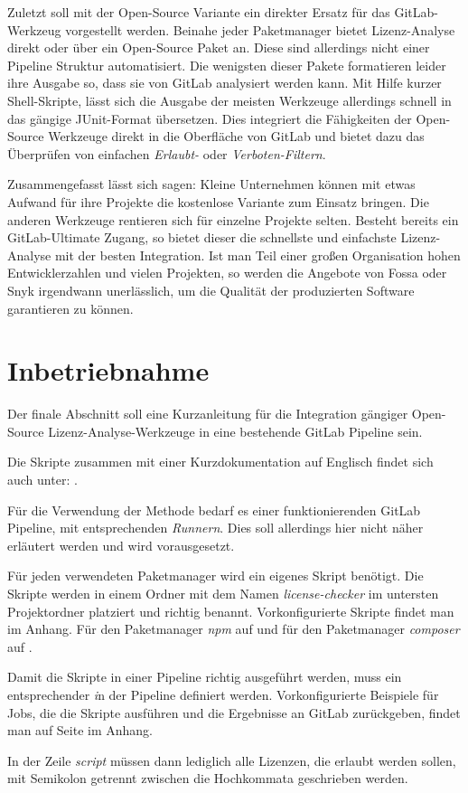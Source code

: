 Zuletzt soll mit der Open-Source Variante ein direkter Ersatz für das GitLab-Werkzeug vorgestellt werden. 
Beinahe jeder Paketmanager bietet Lizenz-Analyse direkt oder über ein Open-Source Paket an. Diese sind allerdings nicht einer Pipeline Struktur automatisiert. 
Die wenigsten dieser Pakete formatieren leider ihre Ausgabe so, dass sie von GitLab analysiert werden kann. Mit Hilfe kurzer Shell-Skripte, lässt sich die Ausgabe der meisten Werkzeuge allerdings schnell in das gängige JUnit-Format \cite{ibmJUnitStandard} übersetzen. Dies integriert die Fähigkeiten der Open-Source Werkzeuge direkt in die Oberfläche von GitLab und bietet dazu das Überprüfen von einfachen \emph{Erlaubt-} oder \emph{Verboten-Filtern}.

Zusammengefasst lässt sich sagen: Kleine Unternehmen können mit etwas Aufwand für ihre Projekte die kostenlose Variante zum Einsatz bringen. Die anderen Werkzeuge rentieren sich für einzelne Projekte selten. Besteht bereits ein GitLab-Ultimate Zugang, so bietet dieser die schnellste und einfachste Lizenz-Analyse mit der besten Integration. Ist man Teil einer großen Organisation hohen Entwicklerzahlen und vielen Projekten, so werden die Angebote von Fossa oder Snyk irgendwann unerlässlich, um die Qualität der produzierten Software garantieren zu können.


\section{Inbetriebnahme}

Der finale Abschnitt soll eine Kurzanleitung für die Integration gängiger Open-Source Lizenz-Analyse-Werkzeuge in eine bestehende GitLab Pipeline sein.

Die Skripte zusammen mit einer Kurzdokumentation auf Englisch findet sich auch unter: \cite{kellOpenSourceLicenseChecker2021}. 

Für die Verwendung der Methode bedarf es einer funktionierenden GitLab Pipeline, mit entsprechenden \emph{Runnern}. Dies soll allerdings hier nicht näher erläutert werden und wird vorausgesetzt. 

Für jeden verwendeten Paketmanager wird ein eigenes Skript benötigt. Die Skripte werden in einem Ordner mit dem Namen \emph{license-checker} im untersten Projektordner platziert und richtig benannt. 
Vorkonfigurierte Skripte findet man im Anhang. Für den Paketmanager \emph{npm} auf  und für den Paketmanager \emph{composer} auf . 

Damit die Skripte in einer Pipeline richtig ausgeführt werden, muss ein entsprechender \emph in der Pipeline definiert werden. Vorkonfigurierte Beispiele für Jobs, die die Skripte ausführen und die Ergebnisse an GitLab zurückgeben, findet man auf Seite  im Anhang.

In der Zeile \emph{script} müssen dann lediglich alle Lizenzen, die erlaubt werden sollen, mit Semikolon getrennt zwischen die Hochkommata geschrieben werden.